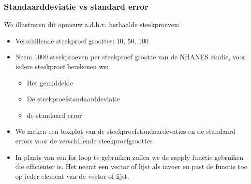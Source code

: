 \documentclass[
  12pt,dutch,coursenotes]{book}
\providecommand{\tightlist}{%
  \setlength{\itemsep}{0pt}\setlength{\parskip}{0pt}}
\theoremstyle{definition}
\theoremstyle{definition}
\theoremstyle{definition}
\theoremstyle{definition}
\theoremstyle{remark}
\begin{document}
\hypertarget{standaarddeviatie-vs-standard-error}{%
\subsubsection{Standaarddeviatie vs standard error}\label{standaarddeviatie-vs-standard-error}}

We illustreren dit opnieuw a.d.h.v. herhaalde steekproeven:

\begin{itemize}
\item
  Verschillende steekproef groottes: 10, 50, 100
\item
  Neem 1000 steekproeven per steekproef grootte van de NHANES studie, voor iedere steekproef berekenen we:

  \begin{itemize}
  \tightlist
  \item
    Het gemiddelde
  \item
    De steekproefstandaarddeviatie
  \item
    de standaard error
  \end{itemize}
\item
  We maken een boxplot van de steekproefstandaardevaties en de standaard errors voor de verschillende steekproefgroottes
\item
  In plaats van een for loop te gebruiken zullen we de sapply functie gebruiken die efficiënter is. Het neemt een vector of lijst als invoer en past de functie toe op ieder element van de vector of lijst.
\end{itemize}
\end{document}
